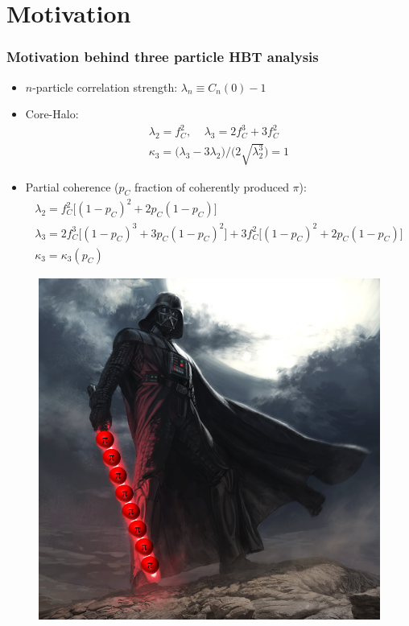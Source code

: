 \documentclass{beamer}
\begin{document}
\section{Motivation}
\begin{frame}
\frametitle{Motivation behind three particle HBT analysis}
\begin{itemize}
\setlength{\itemsep}{8pt}
\vspace*{-8pt}
\item $n$-particle correlation strength: $\lambda_n \equiv C_n(0)-1$
\item Core-Halo: \vspace*{-15pt}
	\begin{align*}
		\lambda_2=f_C^2,\;\;\;\;\lambda_3 = 2f_C^3+3f_C^2 \\ 
		\kappa_3=\big(\lambda_3-3\lambda_2\big)/\big(2\sqrt{\lambda_2^3}\big)=1
	\end{align*}
\item Partial coherence ($p_C$ fraction of coherently produced $\pi$): 
	\begin{gather*}
		\lambda_2=f_C^2\big[(1-p_C)^2+2p_C(1-p_C)\big]\\
		\lambda_3=2f_C^3\big[(1-p_C)^3+3p_C(1-p_C)^2\big]+3f_C^2\big[(1-p_C)^2+2p_C(1-p_C)\big]\nonumber\\
		\kappa_3 = \kappa_3(p_C)
	\end{gather*}
\end{itemize}
\begin{minipage}{0.4\textwidth}
\begin{figure}
\vspace*{-24pt}\includegraphics[scale=0.25]{pic/pionlaser}

\end{figure}
\end{minipage}
\end{frame}
\end{document}
